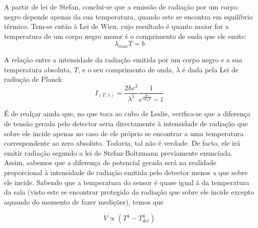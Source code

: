 \documentclass[9pt]{extarticle}
\begin{document}
\begin{multicols}{2}
\par A partir de lei de Stefan, conclui-se que a emissão de radiação por um corpo negro depende apenas da sua temperatura, quando este se encontra em equilíbrio térmico. Tem-se então à Lei de Wien, cujo resultado é quanto maior for a temperatura de um corpo negro menor é o comprimento de onda que ele emite:
\begin{equation}
\lambda_{max} T = b
\end{equation}
\begin{center}
\par{}
\end{center}

\par A relação entre a intensidade da radiação emitida por um corpo negro e a sua temperatura absoluta, $T$, e o seu comprimento de onda, $\lambda$ é dada pela Lei de radiação de Planck:
\begin{equation}
I_{(T,\lambda)} = \frac{2hc^3}{\lambda^5} \frac{1}{e^{\frac{hc}{\lambda k_B T}}-1}
\end{equation}
\begin{center}
\par{}
\end{center}

\par É de realçar ainda que, no que toca ao cubo de Leslie, verifica-se que a diferença de tensão gerada pelo detector seria directamente à intensidade de radiação que sobre ele incide apenas no caso de ele próprio se encontrar a uma temperatura correspondente ao zero absoluto. Todavia, tal não é verdade. De facto, ele irá emitir radiação segundo a lei de Stefan-Boltzmann previamente enunciada. Assim, sabemos que a diferença de potencial gerada será na realidade proporcional à intensidade de radiação emitida pelo detector menos a que sobre ele incide. Sabendo que a temperatura do sensor é quase igual à da temperatura da sala (visto este se encontrar protegido da radiação que sobre ele incide excepto aquando do momento de fazer medições), temos que

\begin{equation}
V \propto (T^4-T_{det}^4)
\end{equation}
\begin{center}
\par{}
\end{center}



\end{multicols}
\end{document}
